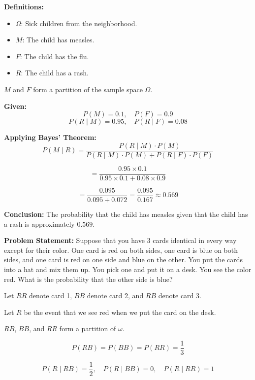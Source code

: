 \documentclass{article}
\begin{document}
    \textbf{Definitions:}
    \begin{itemize}
        \item \(\Omega\): Sick children from the neighborhood.
        \item \(M\): The child has measles.
        \item \(F\): The child has the flu.
        \item \(R\): The child has a rash.
    \end{itemize}
    
    \(M\) and \(F\) form a partition of the sample space \(\Omega\).
    
    \pagebreak
    
    \textbf{Given:}
    \[
        P(M) = 0.1, \quad P(F) = 0.9
    \]
    \[
        P(R \mid M) = 0.95, \quad P(R \mid F) = 0.08
    \]
    
    \bigskip
    
    \textbf{Applying Bayes' Theorem:}
    \[
        P(M \mid R) = \frac{P(R \mid M) \cdot P(M)}{P(R \mid M) \cdot P(M) + P(R \mid F) \cdot P(F)}
    \]
    
    \[
        = \frac{0.95 \times 0.1}{0.95 \times 0.1 + 0.08 \times 0.9}
    \]
    
    \[
        = \frac{0.095}{0.095 + 0.072} = \frac{0.095}{0.167} \approx 0.569
    \]
    
    \bigskip
    
    \textbf{Conclusion:} The probability that the child has measles given that the child has a rash is approximately \( \boxed{0.569} \).

    \textbf{Problem Statement:}
    Suppose that you have 3 cards identical in every way except for their color. One card is red on both sides, one card is blue on both sides, and one card is red on one side and blue on the other. 
    You put the cards into a hat and mix them up. You pick one and put it on a desk. You see the color red. What is the probability that the other side is blue?

    \bigskip

    Let \(RR\) denote card 1, \(BB\) denote card 2, and \(RB\) denote card 3.

    Let \(R\) be the event that we see red when we put the card on the desk.

    \(RB\), \(BB\), and \(RR\) form a partition of \(\omega\).

    \[
        P(RB) = P(BB) = P(RR) = \frac{1}{3}
    \]

    \[
        P(R \mid RB) = \frac{1}{2}, \quad P(R \mid BB) = 0, \quad P(R \mid RR) = 1
    \]
\end{document}
